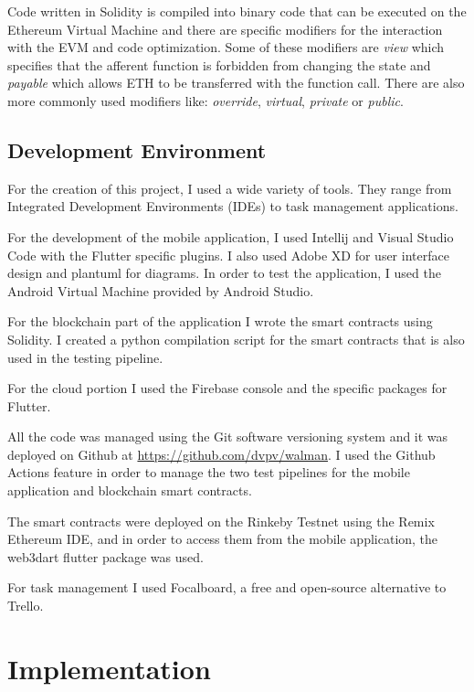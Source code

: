 \documentclass[a4paper,12pt]{report}
\begin{document}
Code written in Solidity is compiled into binary code that can be executed on
the Ethereum Virtual Machine and there are specific modifiers for the
interaction with the EVM and code optimization. Some of these modifiers are
\textit{view} which specifies that the afferent function is forbidden from
changing the state and \textit{payable} which allows ETH to be transferred with
the function call. There are also more commonly used modifiers like:
\textit{override}, \textit{virtual}, \textit{private} or \textit{public}.

\section{Development Environment}

For the creation of this project, I used a wide variety of tools. They range
from Integrated Development Environments (IDEs) to task management
applications.

For the development of the mobile application, I used Intellij and Visual
Studio Code with the Flutter specific plugins. I also used Adobe XD for user
interface design and plantuml for diagrams. In order to test the application, I
used the Android Virtual Machine provided by Android Studio.

For the blockchain part of the application I wrote the smart contracts using
Solidity. I created a python compilation script for the smart contracts that is
also used in the testing pipeline.

For the cloud portion I used the Firebase console and the specific packages for
Flutter.

All the code was managed using the Git software versioning system and it was
deployed on Github at \url{https://github.com/dvpv/walman}. I used the Github
Actions feature in order to manage the two test pipelines for the mobile
application and blockchain smart contracts.

The smart contracts were deployed on the Rinkeby Testnet using the Remix
Ethereum IDE, and in order to access them from the mobile application, the
web3dart\cite{web3dartDocs} flutter package was used.

For task management I used Focalboard, a free and open-source alternative to
Trello.

\chapter{Implementation}
\end{document}

